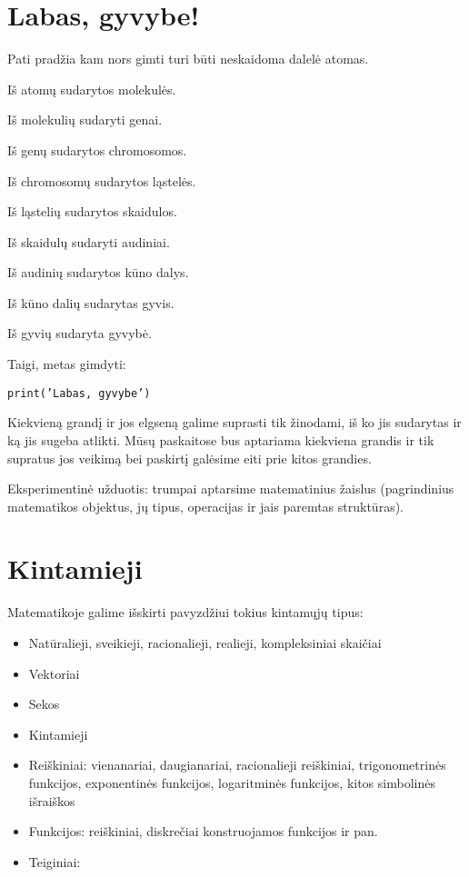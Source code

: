 \documentclass[a4paper]{article}
\begin{document}
\section{Labas, gyvybe!}
Pati pradžia kam nors gimti turi būti neskaidoma dalelė atomas. 

Iš atomų sudarytos molekulės.

Iš molekulių sudaryti genai.

Iš genų sudarytos chromosomos.

Iš chromosomų sudarytos ląstelės.

Iš ląstelių sudarytos skaidulos.

Iš skaidulų sudaryti audiniai.

Iš audinių sudarytos kūno dalys.

Iš kūno dalių sudarytas gyvis.

Iš gyvių sudaryta gyvybė.

Taigi, metas gimdyti:

\texttt{print('Labas, gyvybe')}

\begin{framed}
Kiekvieną grandį ir jos elgseną galime suprasti tik žinodami, iš ko jis sudarytas ir ką jis sugeba atlikti. Mūsų paskaitose bus aptariama kiekviena grandis ir tik supratus jos veikimą bei paskirtį galėsime eiti prie kitos grandies.
\end{framed}

Eksperimentinė užduotis: trumpai aptarsime matematinius žaislus (pagrindinius matematikos objektus, jų tipus, operacijas ir jais paremtas struktūras).

\section{Kintamieji}

Matematikoje galime išskirti pavyzdžiui tokius kintamųjų tipus:

\begin{itemize}
\item Natūralieji, sveikieji, racionalieji, realieji, kompleksiniai skaičiai
\item Vektoriai
\item Sekos
\item Kintamieji
\item Reiškiniai: vienanariai, daugianariai, racionalieji reiškiniai, trigonometrinės funkcijos, exponentinės funkcijos, logaritminės funkcijos, kitos simbolinės išraiškos 
\item Funkcijos: reiškiniai, diskrečiai konstruojamos funkcijos ir pan.
\item Teiginiai: 
\end{itemize}
\end{document}

